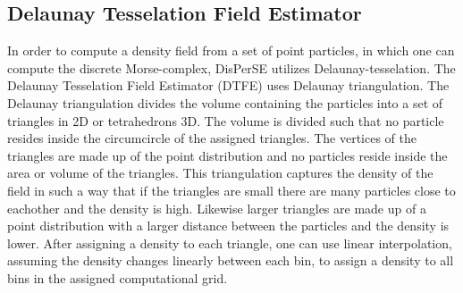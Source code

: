 \subsection{Delaunay Tesselation Field Estimator}
In order to compute a density field from a set of point particles, in which one
can compute the discrete Morse-complex, DisPerSE utilizes
Delaunay-tesselation\cite{2000A&A...363L..29S}. The Delaunay Tesselation Field
Estimator (DTFE) uses Delaunay triangulation. The Delaunay triangulation
divides the volume containing the particles into a set of triangles in 2D or
tetrahedrons 3D. The volume is divided such that no particle resides inside the
circumcircle of the assigned triangles. The vertices of the triangles are made
up of the point distribution and no particles reside inside the area or volume
of the triangles. This triangulation captures the density of the field in such a
way that if the triangles are small there are many particles close to eachother
and the density is high. Likewise larger triangles are made up of a point
distribution with a larger distance between the particles and the density is
lower. After assigning a density to each triangle, one can use linear
interpolation, assuming the density changes linearly between each bin, to assign
a density to all bins in the assigned computational grid.

